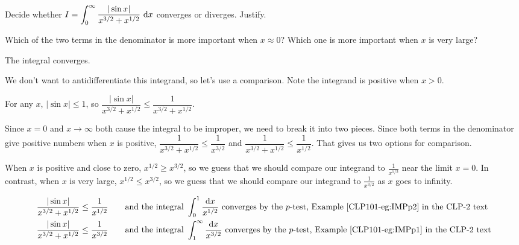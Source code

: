 \begin{question}[M121 1999A]
Decide whether
$I=\displaystyle\int_0^\infty\frac{|\sin x|}{x^{3/2}+x^{1/2}}\ \mathrm{d}x $
converges or diverges. Justify.
\end{question}

\begin{hint}
Which of the two terms in the denominator is more important when $x\approx
0$? Which one is more important when $x$ is very large?
\end{hint}

\begin{answer}
The integral converges.
\end{answer}

\begin{solution}
We don't want to antidifferentiate this integrand, so let's use a comparison. Note the integrand is positive when $x>0$.

For any $x$, $|\sin x| \leq 1$, so $\dfrac{|\sin x|}{x^{3/2}+x^{1/2}} \leq \dfrac{1}{x^{3/2}+x^{1/2}} $.


Since $x=0$ and $x \to \infty$ both cause the integral to be improper, we need to break it into two pieces.
Since both terms in the denominator give positive numbers when $x$ is positive, $\dfrac{1}{x^{3/2}+x^{1/2}} \leq \dfrac{1}{x^{3/2}}$ and $\dfrac{1}{x^{3/2}+x^{1/2}} \leq \dfrac{1}{x^{1/2}}$. That gives us two options for comparison.

When $x$ is positive and close to zero, $x^{1/2}  \ge x^{3/2}$, so we guess that we should compare our integrand to $\frac{1}{x^{1/2}}$ near the limit $x=0$. In contrast, when $x$ is very large, $x^{1/2}  \le x^{3/2}$, so we guess that we should compare our integrand to $\frac{1}{x^{3/2}}$ as $x$ goes to infinity.

\begin{alignat*}{3}
\frac{|\sin x|}{x^{3/2}+x^{1/2}}
&\le \frac{1}{x^{1/2}}
\quad&&\text{and the integral }\int_0^1\frac{\dee{x}}{x^{1/2}}\text{ converges
by the $p$-test,  Example \eref{CLP101}{eg:IMPp2} in the CLP-2 text} \\
\frac{|\sin x|}{x^{3/2}+x^{1/2}}
&\le \frac{1}{x^{3/2}}
\quad&&\text{and the integral }\int_1^\infty\frac{\dee{x}}{x^{3/2}}\text{ converges
by the $p$-test, Example \eref{CLP101}{eg:IMPp1} in the CLP-2 text}
\end{alignat*}


\end{solution}
